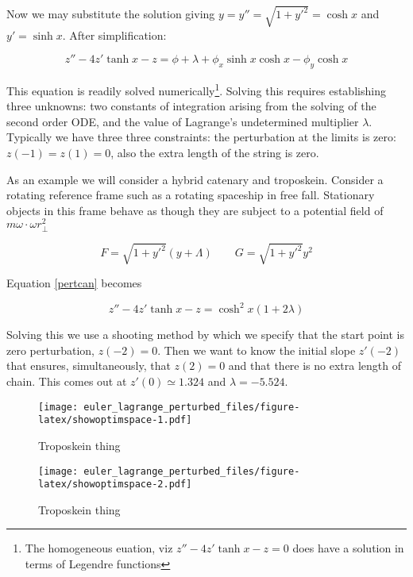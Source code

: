 \documentclass[pdflatex,sn-mathphys-num]{sn-jnl}%
\theoremstyle{thmstyleone}%
\theoremstyle{thmstyletwo}%
\theoremstyle{thmstylethree}%
\begin{document}
Now we may substitute the solution giving $y=y''=\sqrt{1+y'^2}=\cosh
x$ and $y'=\sinh x$.  After simplification:

\begin{equation}\label{pertcan}
  z'' - 4z'\tanh x - z =
  \phi + \lambda + \phi_x\sinh x\cosh x - \phi_y\cosh x
\end{equation}

This equation is readily solved numerically\footnote{The homogeneous
euation, viz $z'' - 4z'\tanh x - z = 0$ does have a solution in terms
of Legendre functions}.  Solving this requires establishing three
unknowns: two constants of integration arising from the solving of the
second order ODE, and the value of Lagrange's undetermined multiplier
$\lambda$.  Typically we have three three constraints: the
perturbation at the limits is zero: $z(-1)=z(1)=0$, also the extra
length of the string is zero.

As an example we will consider a hybrid catenary and troposkein.
Consider a rotating reference frame such as a rotating spaceship in
free fall.  Stationary objects in this frame behave as though they are
subject to a potential field of $m\omega\cdot\omega r_\perp^2$

\begin{equation}
  F = \sqrt{1+y'^2}(y+\Lambda)\qquad
  G = \sqrt{1+y'^2}y^2
\end{equation}

Equation \ref{pertcan} becomes

\begin{equation}
  z'' - 4z'\tanh x - z = \cosh^2 x(1+2\lambda)
\end{equation}

Solving this we use a shooting method by which we specify that the
start point is zero perturbation, $z(-2)=0$.  Then we want to know the
initial slope $z'(-2)$ that ensures, simultaneously, that $z(2)=0$ and
that there is no extra length of chain.  This comes out at
$z'(0)\simeq 1.324$ and $\lambda = -5.524$.


\begin{figure}[h]
\centering
\texttt{[image: euler\_lagrange\_perturbed\_files/figure-latex/showoptimspace-1.pdf]}
\caption{Troposkein thing}\label{space}
\end{figure}

\begin{figure}[h]
\centering
\texttt{[image: euler\_lagrange\_perturbed\_files/figure-latex/showoptimspace-2.pdf]}
\caption{Troposkein thing}\label{space2}
\end{figure}
\end{document}
